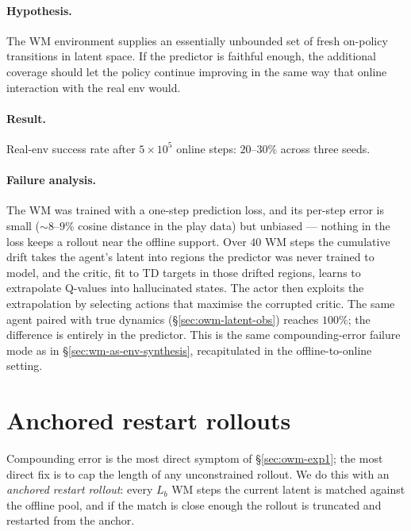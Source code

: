 \paragraph{Hypothesis.}
The WM environment supplies an essentially unbounded set of fresh
on-policy transitions in latent space. If the predictor is faithful
enough, the additional coverage should let the policy continue improving
in the same way that online interaction with the real env would.

\paragraph{Result.}
Real-env success rate after $5\!\times\!10^5$ online steps:
$20$--$30\%$ across three seeds.

\paragraph{Failure analysis.}
The WM was trained with a one-step prediction loss, and its per-step
error is small ($\sim\!8$--$9\%$ cosine distance in the play data) but
unbiased --- nothing in the loss keeps a rollout near the offline
support. Over $40$ WM steps the cumulative drift takes the agent's
latent into regions the predictor was never trained to model, and the
critic, fit to TD targets in those drifted regions, learns to
extrapolate Q-values into hallucinated states. The actor then exploits
the extrapolation by selecting actions that maximise the corrupted
critic. The same agent paired with true dynamics
(§\ref{sec:owm-latent-obs}) reaches $100\%$; the difference is entirely
in the predictor. This is the same compounding-error failure mode as in
\S\ref{sec:wm-as-env-synthesis}, recapitulated in the
offline-to-online setting.

\section{Anchored restart rollouts}
\label{sec:owm-exp2}

Compounding error is the most direct symptom of §\ref{sec:owm-exp1};
the most direct fix is to cap the length of any unconstrained rollout.
We do this with an \emph{anchored restart rollout}: every $L_b$ WM
steps the current latent is matched against the offline pool, and if
the match is close enough the rollout is truncated and restarted from
the anchor.

